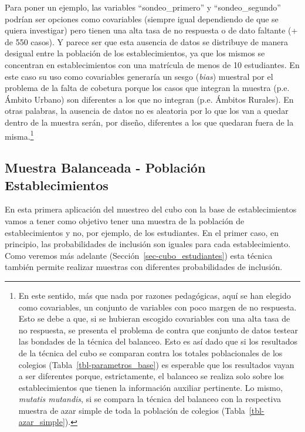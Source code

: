 \documentclass[
  spanish,
  a4paper,
]{scrreprt}
\begin{document}
Para poner un ejemplo, las variables ``sondeo\_primero'' y
``sondeo\_segundo'' podrían ser opciones como covariables (siempre igual
dependiendo de que se quiera investigar) pero tienen una alta tasa de no
respuesta o de dato faltante (+ de 550 casos). Y parece ser que esta
ausencia de datos se distribuye de manera desigual entre la población de
los establecimientos, ya que los mismos se concentran en
establecimientos con una matrícula de menos de 10 estudiantes. En este
caso su uso como covariables generaría un sesgo (\emph{bias}) muestral
por el problema de la falta de cobetura porque los casos que integran la
muestra (p.e. Ámbito Urbano) son diferentes a los que no integran (p.e.
Ámbitos Rurales). En otras palabras, la ausencia de datos no es
aleatoria por lo que los van a quedar dentro de la muestra serán, por
diseño, diferentes a los que quedaran fuera de la misma.\footnote{En
  este sentido, más que nada por razones pedagógicas, aquí se han
  elegido como covariables, un conjunto de variables con poco margen de
  no respuesta. Esto se debe a que, si se hubieran escogido covariables
  con una alta tasa de no respuesta, se presenta el problema de contra
  que conjunto de datos testear las bondades de la técnica del balanceo.
  Esto es así dado que si los resultados de la técnica del cubo se
  comparan contra los totales poblacionales de los colegios
  (Tabla~\ref{tbl-parametros_base}) es esperable que los resultados
  vayan a ser diferentes porque, estrictamente, el balanceo se realiza
  solo sobre los establecimientos que tienen la información auxiliar
  pertinente. Lo mismo, \emph{mutatis mutandis}, si se compara la
  técnica del balanceo con la respectiva muestra de azar simple de toda
  la población de colegios (Tabla~\ref{tbl-azar_simple}).}

\subsection{Muestra Balanceada - Población
Establecimientos}\label{sec-cubo_colegios}

En esta primera aplicación del muestreo del cubo con la base de
establecimientos vamos a tener como objetivo tener una muestra de la
población de establecimientos y no, por ejemplo, de los estudiantes. En
el primer caso, en principio, las probabilidades de inclusión son
iguales para cada establecimiento. Como veremos más adelante
(Sección~\ref{sec-cubo_estudiantes}) esta técnica también permite
realizar muestras con diferentes probabilidades de inclusión.
\end{document}
